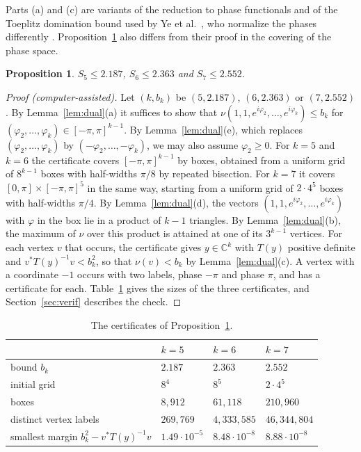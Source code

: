 \documentclass[11pt]{amsart}
\newtheorem{proposition}[theorem]{Proposition}
\theoremstyle{remark}
\numberwithin{equation}{section}
\newcommand{\C}{\mathbb{C}}
\newcommand{\FiveOwn}{2.187}
\newcommand{\NBoxes}{8{,}912}
\newcommand{\NVert}{269{,}769}
\newcommand{\SixOwn}{2.363}
\newcommand{\NBoxesSix}{61{,}118}
\newcommand{\MinSlackSix}{$8.48\cdot10^{-8}$}
\newcommand{\MinSlack}{$1.49\cdot10^{-5}$}
\newcommand{\SevenOwn}{2.552}
\newcommand{\NBoxesSeven}{210{,}960}
\newcommand{\MinSlackSeven}{$8.88\cdot10^{-8}$}
\begin{document}
Parts (a) and (c) are variants of the reduction to phase functionals and of the Toeplitz domination bound used by Ye et al.\ \cite[(14) and Proposition~3.2]{Ye26}, who normalize the phases differently \cite[(17)]{Ye26}. Proposition~\ref{prop:s5} also differs from their proof in the covering of the phase space.

\begin{proposition}\label{prop:s5}
$S_5\le\FiveOwn$, $S_6\le\SixOwn$ and $S_7\le\SevenOwn$.
\end{proposition}

\begin{proof}[Proof \textup{(computer-assisted)}]
Let $(k,b_k)$ be $(5,\FiveOwn)$, $(6,\SixOwn)$ or $(7,\SevenOwn)$. By Lemma~\ref{lem:dual}(a) it suffices to show that $\nu(1,1,e^{i\varphi_2},\dots,e^{i\varphi_k})\le b_k$ for $(\varphi_2,\dots,\varphi_k)\in[-\pi,\pi]^{k-1}$. By Lemma~\ref{lem:dual}(e), which replaces $(\varphi_2,\dots,\varphi_k)$ by $(-\varphi_2,\dots,-\varphi_k)$, we may also assume $\varphi_2\ge0$. For $k=5$ and $k=6$ the certificate covers $[-\pi,\pi]^{k-1}$ by boxes, obtained from a uniform grid of $8^{k-1}$ boxes with half-widths $\pi/8$ by repeated bisection. For $k=7$ it covers $[0,\pi]\times[-\pi,\pi]^5$ in the same way, starting from a uniform grid of $2\cdot4^5$ boxes with half-widths $\pi/4$. By Lemma~\ref{lem:dual}(d), the vectors $(1,1,e^{i\varphi_2},\dots,e^{i\varphi_k})$ with $\varphi$ in the box lie in a product of $k-1$ triangles. By Lemma~\ref{lem:dual}(b), the maximum of $\nu$ over this product is attained at one of its $3^{k-1}$ vertices. For each vertex $v$ that occurs, the certificate gives $y\in\C^k$ with $T(y)$ positive definite and $v^*T(y)^{-1}v<b_k^2$, so that $\nu(v)<b_k$ by Lemma~\ref{lem:dual}(c). A vertex with a coordinate $-1$ occurs with two labels, phase $-\pi$ and phase $\pi$, and has a certificate for each. Table~\ref{tab:certs} gives the sizes of the three certificates, and Section~\ref{sec:verif} describes the check.
\end{proof}

\begin{table}[ht]
\centering
\caption{The certificates of Proposition~\ref{prop:s5}.}\label{tab:certs}
\begin{tabular}{@{}llll@{}}
\toprule
 & $k=5$ & $k=6$ & $k=7$\\
\midrule
bound $b_k$ & $\FiveOwn$ & $\SixOwn$ & $\SevenOwn$\\
initial grid & $8^4$ & $8^5$ & $2\cdot4^5$\\
boxes & $\NBoxes$ & $\NBoxesSix$ & $\NBoxesSeven$\\
distinct vertex labels & $\NVert$ & $4{,}333{,}585$ & $46{,}344{,}804$\\
smallest margin $b_k^2-v^*T(y)^{-1}v$ & \MinSlack & \MinSlackSix & \MinSlackSeven\\
\bottomrule
\end{tabular}
\end{table}
\end{document}
